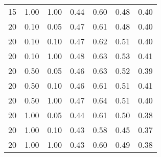 \begin{tabular}{lllcccc}
15 & 1.00 & 1.00 & 0.44 & 0.60 & 0.48 & 0.40 \\ 
20 & 0.10 & 0.05 & 0.47 & 0.61 & 0.48 & 0.40 \\ 
20 & 0.10 & 0.10 & 0.47 & 0.62 & 0.51 & 0.40 \\ 
20 & 0.10 & 1.00 & 0.48 & 0.63 & 0.53 & 0.41 \\ 
20 & 0.50 & 0.05 & 0.46 & 0.63 & 0.52 & 0.39 \\ 
20 & 0.50 & 0.10 & 0.46 & 0.61 & 0.51 & 0.41 \\ 
20 & 0.50 & 1.00 & 0.47 & 0.64 & 0.51 & 0.40 \\ 
20 & 1.00 & 0.05 & 0.44 & 0.61 & 0.50 & 0.38 \\ 
20 & 1.00 & 0.10 & 0.43 & 0.58 & 0.45 & 0.37 \\ 
20 & 1.00 & 1.00 & 0.43 & 0.60 & 0.49 & 0.38 \\ 
\end{tabular} 

